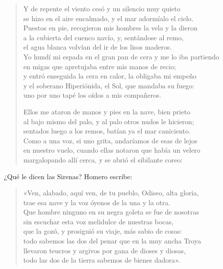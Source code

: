 \begin{verse}
Y de repente el viento cesó y un silencio muy quieto\\
se hizo en el aire encalmado, y el mar adormíalo el cielo.\\
Puestos en pie, recogieron mis hombres la vela y la dieron\\
a la cubierta del cuenco navío, y, sentándose al remo,\\
el agua blanca volvían del ir de los lisos maderos.\\
Yo hundí mi espada en el gran pan de cera y me lo iba partiendo\\
en migas que apretujaba entre mis manos de recio;\\
y entró enseguida la cera en calor, la obligaba mi empeño\\
y el soberano Hiperiónida, el Sol, que mandaba su fuego:\\
uno por uno tapé los oídos a mis compañeros.

Ellos me ataron de manos y pies en la nave, bien prieto\\
al bajo mismo del palo, y al palo otros nudos le hicieron;\\
sentados luego a los remos, batían ya el mar caniciento.\\
Como a una voz, si uno grita, andaríamos de esas de lejos\\
en nuestro vuelo, cuando ellas notaron que había un velero\\
margalopando allí cerca, y se abrió el sibilante coreo:
\end{verse}

¿Qué le dicen las Sirenas? Homero escribe:

\begin{verse}
«Ven, alabado, aquí ven, de tu pueblo, Odiseo, alta gloria,\\
trae esa nave y la voz óyenos de la una y la otra.\\
Que hombre ninguno en su negra goleta se fue de nosotras\\
sin escuchar esta voz melidulce de nuestras bocas,\\
que la gozó, y prosiguió su viaje, más sabio de cosas:\\
todo sabemos las dos del penar que en la muy ancha Troya\\
llevaron teucros y argivos por gana de dioses y diosas,\\
todo las dos de la tierra sabemos de bienes dadora».
\end{verse}

